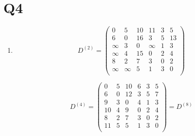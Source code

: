 \documentclass[12pt,a4paper]{article}
\begin{document}
\section*{Q4}
	\begin{enumerate}[label=(\alph*)]
		\item \-
		\[
		D^{(2)} =
		\begin{pmatrix}
		0        & 5 & 10 & 11       & 3 & 5  \\
		6        & 0 & 16 & 3        & 5 & 13 \\ 
		\infty & 3 & 0  & \infty & 1 & 3  \\ 
		\infty & 4 & 15 & 0        & 2 & 4  \\ 
		8        & 2 & 7  & 3        & 0 & 2  \\ 
		\infty & \infty  & 5  & 1        & 3 & 0  \\ 
		\end{pmatrix}
		\]

		\[
		D^{(4)} =
		\begin{pmatrix}
		0        & 5 & 10 & 6       & 3 & 5  \\
		6        & 0 & 12 & 3        & 5 & 7 \\ 
		9 & 3 & 0  & 4 & 1 & 3  \\ 
		10 & 4 & 9 & 0        & 2 & 4  \\ 
		8        & 2 & 7  & 3        & 0 & 2  \\ 
		11 & 5  & 5  & 1        & 3 & 0  \\ 
		\end{pmatrix}
		= D^{(8)}
		\]


\end{enumerate}
\end{document}

